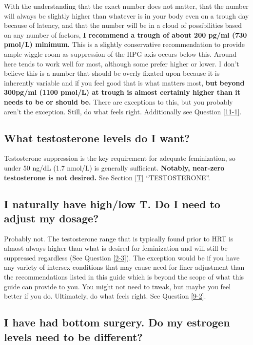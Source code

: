 \documentclass{article}
\begin{document}
With the understanding that the exact number does not matter, that the number will always be slightly higher than whatever is in your body even on a trough day because of latency, and that the number will be in a cloud of possibilities based on any number of factors, \textbf{I recommend a trough of about 200 pg/ml (730 pmol/L) minimum.} This is a slightly conservative recommendation to provide ample wiggle room as suppression of the HPG axis occurs below this. Around here tends to work well for most, although some prefer higher or lower. I don’t believe this is a number that should be overly fixated upon because it is inherently variable and if you feel good that is what matters most, \textbf{but} \textbf{beyond 300pg/ml (1100 pmol/L) at trough is almost certainly higher than it needs to be or should be.} There are exceptions to this, but you probably aren't the exception. Still, do what feels right. Additionally see Question \ref{11-1}.

\subsection{What testosterone levels do I want?}

Testosterone suppression is the key requirement for adequate feminization, so under 50 ng/dL (1.7 nmol/L) is generally sufficient. \textbf{Notably, near-zero testosterone is not desired.} See Section \ref{T} “TESTOSTERONE”.

\subsection{I naturally have high/low T. Do I need to adjust my dosage?}

Probably not. The testosterone range that is typically found prior to HRT is almost always higher than what is desired for feminization and will still be suppressed regardless (See Question \ref{2-3}). The exception would be if you have any variety of intersex conditions that may cause need for finer adjustment than the recommendations listed in this guide which is beyond the scope of what this guide can provide to you. You might not need to tweak, but maybe you feel better if you do. Ultimately, do what feels right. See Question \ref{9-2}.

\subsection{I have had bottom surgery. Do my estrogen levels need to be different?}
\end{document}
